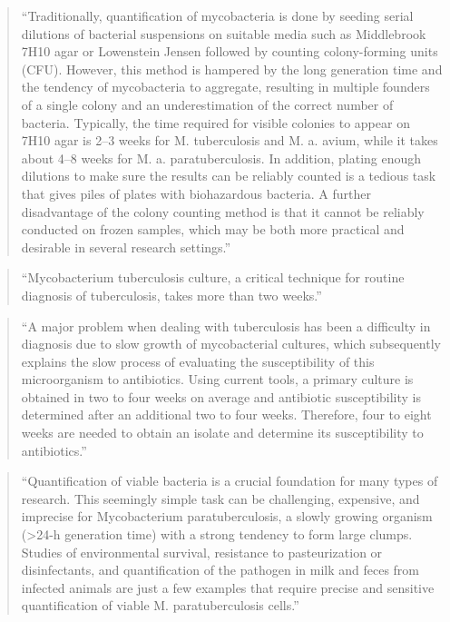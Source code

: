 \documentclass[]{tufte-book}
\begin{document}
\begin{quote}
``Traditionally, quantification of mycobacteria is done by seeding serial
dilutions of bacterial suspensions on suitable media such as Middlebrook 7H10
agar or Lowenstein Jensen followed by counting colony-forming units (CFU).
However, this method is hampered by the long generation time and the tendency of
mycobacteria to aggregate, resulting in multiple founders of a single colony and
an underestimation of the correct number of bacteria. Typically, the time
required for visible colonies to appear on 7H10 agar is 2--3 weeks for M.
tuberculosis and M. a. avium, while it takes about 4--8 weeks for M. a.
paratuberculosis. In addition, plating enough dilutions to make sure the results
can be reliably counted is a tedious task that gives piles of plates with
biohazardous bacteria. A further disadvantage of the colony counting method is
that it cannot be reliably conducted on frozen samples, which may be both more
practical and desirable in several research settings.'' \citep{pathak2012counting}
\end{quote}

\begin{quote}
``Mycobacterium tuberculosis culture, a critical technique for routine diagnosis of tuberculosis, takes more than two weeks.'' \citep{ghodbane2014dramatic}
\end{quote}

\begin{quote}
``A major problem when dealing with tuberculosis has been a difficulty in
diagnosis due to slow growth of mycobacterial cultures, which subsequently
explains the slow process of evaluating the susceptibility of this microorganism
to antibiotics. Using current tools, a primary culture is obtained in two to
four weeks on average and antibiotic susceptibility is determined after an
additional two to four weeks. Therefore, four to eight weeks are needed to
obtain an isolate and determine its susceptibility to antibiotics.''
\citep{ghodbane2014dramatic}
\end{quote}

\begin{quote}
``Quantification of viable bacteria is a crucial foundation for many types of
research. This seemingly simple task can be challenging, expensive, and
imprecise for Mycobacterium paratuberculosis, a slowly growing organism (\textgreater24-h
generation time) with a strong tendency to form large clumps. Studies of
environmental survival, resistance to pasteurization or disinfectants, and
quantification of the pathogen in milk and feces from infected animals are just
a few examples that require precise and sensitive quantification of viable M.
paratuberculosis cells.'' \citep{shin2007rapid}
\end{quote}
\end{document}
